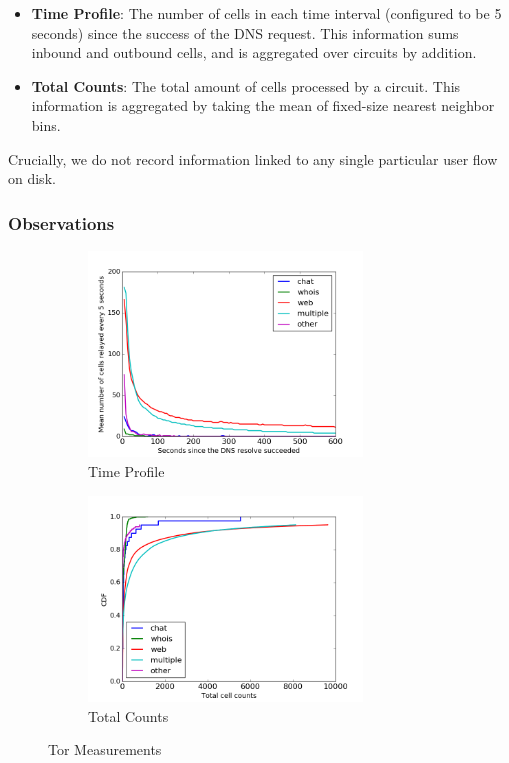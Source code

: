 \begin{itemize}
\item \textbf{Time Profile}: The number of cells in each time interval
  (configured to be 5 seconds) since the success of the DNS request. This
  information sums inbound and outbound cells, and is aggregated over circuits
  by addition.
\item \textbf{Total Counts}: The total amount of cells processed by a
  circuit. This information is aggregated by taking the mean of fixed-size
  nearest neighbor bins.
\end{itemize}

Crucially, we do not record information linked to any single particular user
flow on disk.

\subsubsection{Observations}
\begin{figure} \centering
	\begin{subfigure}[t]{0.49\textwidth} \centering
\includegraphics[width=0.8\textwidth]{images/exitmeasurement.png}
		\caption{Time Profile}
\label{fig:statsa}
	\end{subfigure}
	\begin{subfigure}[t]{0.49\textwidth} \centering
\includegraphics[width=0.8\textwidth]{images/totcellcountscdf.png}
		\caption{Total Counts}
\label{fig:statsb}
	\end{subfigure}
	\caption{Tor Measurements}
\label{fig:measurements}
\end{figure}

